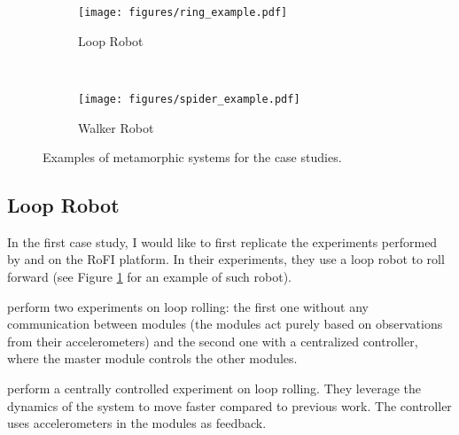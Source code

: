 \begin{figure}[!t]
    \centering
    \begin{subfigure}[b]{0.45\textwidth}
        \texttt{[image: figures/ring\_example.pdf]}
        \caption{Loop Robot}
        \label{fig:example_roller}
    \end{subfigure}
    ~
    \begin{subfigure}[b]{0.45\textwidth}
        \texttt{[image: figures/spider\_example.pdf]}
        \caption{Walker Robot}
        \label{fig:example_spider}
    \end{subfigure}

    \caption{Examples of metamorphic systems for the case studies.}
\end{figure}

\subsection{Loop Robot}

In the first case study, I would like to first replicate the experiments
performed by \textcite{superbotroller} and
\textcite{DBLP:journals/ijrr/SastraCY09} on the RoFI platform. In their
experiments, they use a loop robot to roll forward (see Figure
\ref{fig:example_roller} for an example of such robot).

\textcite{superbotroller} perform two experiments on loop rolling: the first one
without any communication between modules (the modules act purely based on
observations from their accelerometers) and the second one with a centralized
controller, where the master module controls the other modules.

\textcite{DBLP:journals/ijrr/SastraCY09} perform a centrally controlled
experiment on loop rolling. They leverage the dynamics of the system to move
faster compared to previous work. The controller uses accelerometers in the
modules as feedback.

